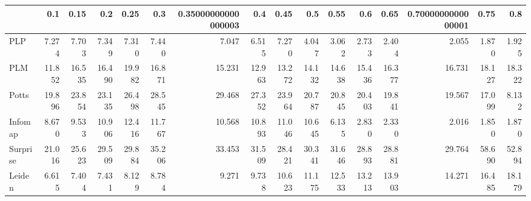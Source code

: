 \begin{tabular}{lrrrrrrrrrrrrrrr}
\toprule
{} &    0.1 &   0.15 &    0.2 &   0.25 &    0.3 & 0.35000000000000003 &    0.4 &   0.45 &    0.5 &   0.55 &    0.6 &   0.65 & 0.7000000000000001 &   0.75 &    0.8 \\
\midrule
PLP      &  7.274 &  7.703 &  7.349 &  7.310 &  7.440 &               7.047 &  6.515 &  7.270 &  4.047 &  3.062 &  2.733 &  2.404 &              2.055 &  1.870 &  1.925 \\
PLM      & 11.852 & 16.535 & 16.490 & 19.982 & 16.871 &              15.231 & 12.963 & 13.272 & 14.132 & 14.638 & 15.436 & 16.377 &             16.731 & 18.127 & 18.322 \\
Potts    & 19.896 & 23.854 & 23.135 & 26.498 & 28.545 &              29.468 & 27.352 & 23.964 & 20.787 & 20.845 & 20.403 & 19.841 &             19.567 & 17.099 &  8.132 \\
Infomap  &  8.670 &  9.533 & 10.906 & 12.416 & 11.767 &              10.568 & 10.893 & 11.046 & 10.645 &  6.135 &  2.830 &  2.330 &              2.016 &  1.850 &  1.870 \\
Surprise & 21.016 & 25.623 & 29.509 & 29.884 & 35.206 &              33.453 & 31.509 & 28.421 & 30.341 & 31.646 & 28.893 & 28.881 &             29.764 & 58.690 & 52.894 \\
Leiden   &  6.615 &  7.404 &  7.431 &  8.129 &  8.784 &               9.271 &  9.738 & 10.623 & 11.175 & 12.533 & 13.213 & 13.903 &             14.271 & 16.485 & 18.179 \\
\bottomrule
\end{tabular}
